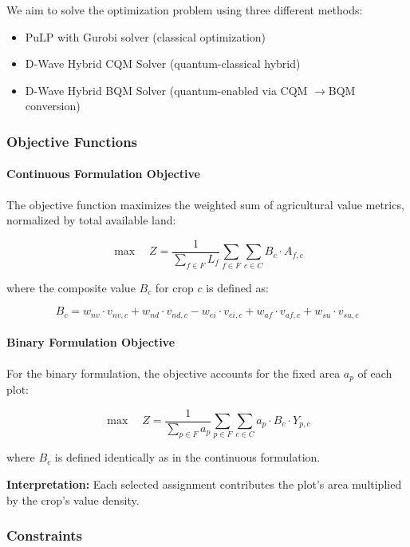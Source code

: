 \documentclass{oqireport}
\begin{document}
We aim to solve the optimization problem using three different methods:
\begin{itemize}
    \item PuLP with Gurobi solver (classical optimization)
    \item D-Wave Hybrid CQM Solver (quantum-classical hybrid)
    \item D-Wave Hybrid BQM Solver (quantum-enabled via CQM $\to$BQM conversion)
\end{itemize}



\subsubsection{Objective Functions}

\paragraph{Continuous Formulation Objective}

The objective function maximizes the weighted sum of agricultural value metrics, normalized by total available land:

$$\max \quad Z = \frac{1}{\sum_{f \in F} L_f} \sum_{f \in F} \sum_{c \in C} B_c \cdot A_{f,c}$$

where the composite value $B_c$ for crop $c$ is defined as:

$$B_c = w_{nv} \cdot v_{nv,c} + w_{nd} \cdot v_{nd,c} - w_{ei} \cdot v_{ei,c} + w_{af} \cdot v_{af,c} + w_{su} \cdot v_{su,c}$$


\paragraph{Binary Formulation Objective}

For the binary formulation, the objective accounts for the fixed area $a_p$ of each plot:

$$\max \quad Z = \frac{1}{\sum_{p \in F} a_p} \sum_{p \in F} \sum_{c \in C} a_p \cdot B_c \cdot Y_{p,c}$$

where $B_c$ is defined identically as in the continuous formulation.

\textbf{Interpretation:} Each selected assignment contributes the plot's area multiplied by the crop's value density.

\subsubsection{Constraints}
\end{document}
